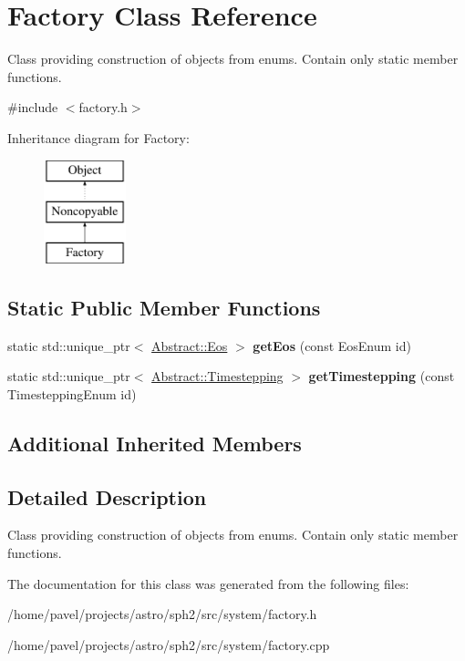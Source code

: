 \hypertarget{classFactory}{}\section{Factory Class Reference}
\label{classFactory}


Class providing construction of objects from enums. Contain only static member functions.  




{\ttfamily \#include $<$factory.\+h$>$}

Inheritance diagram for Factory\+:\begin{figure}[H]
\begin{center}
\leavevmode
\includegraphics[height=3.000000cm]{classFactory}
\end{center}
\end{figure}
\subsection*{Static Public Member Functions}
\begin{DoxyCompactItemize}
\item 
\hypertarget{classFactory_a5a3f36d2925b0a78fecc385f391f9580}{}\label{classFactory_a5a3f36d2925b0a78fecc385f391f9580} 
static std\+::unique\+\_\+ptr$<$ \hyperlink{classAbstract_1_1Eos}{Abstract\+::\+Eos} $>$ {\bfseries get\+Eos} (const Eos\+Enum id)
\item 
\hypertarget{classFactory_a943bdf4efc1893c8ed68222a67e485ed}{}\label{classFactory_a943bdf4efc1893c8ed68222a67e485ed} 
static std\+::unique\+\_\+ptr$<$ \hyperlink{classAbstract_1_1Timestepping}{Abstract\+::\+Timestepping} $>$ {\bfseries get\+Timestepping} (const Timestepping\+Enum id)
\end{DoxyCompactItemize}
\subsection*{Additional Inherited Members}


\subsection{Detailed Description}
Class providing construction of objects from enums. Contain only static member functions. 

The documentation for this class was generated from the following files\+:\begin{DoxyCompactItemize}
\item 
/home/pavel/projects/astro/sph2/src/system/factory.\+h\item 
/home/pavel/projects/astro/sph2/src/system/factory.\+cpp\end{DoxyCompactItemize}
